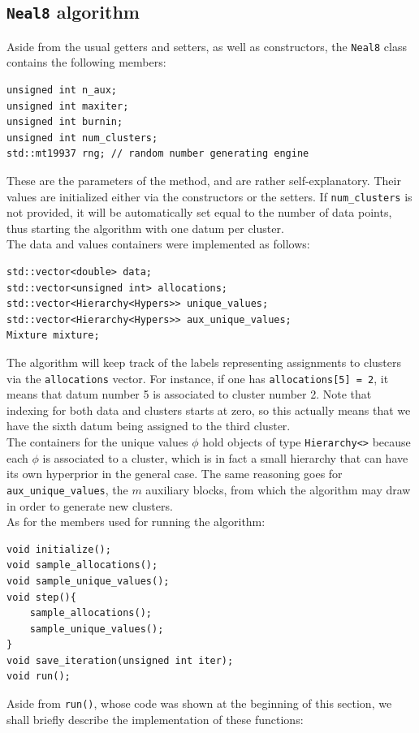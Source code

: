 \subsection{\texttt{Neal8} algorithm}
Aside from the usual getters and setters, as well as constructors, the \verb|Neal8| class contains the following members:
\begin{verbatim}
unsigned int n_aux;
unsigned int maxiter;
unsigned int burnin;
unsigned int num_clusters;
std::mt19937 rng; // random number generating engine
\end{verbatim}
These are the parameters of the method, and are rather self-explanatory.
Their values are initialized either via the constructors or the setters.
If \verb|num_clusters| is not provided, it will be automatically set equal to the number of data points, thus starting the algorithm with one datum per cluster. \\
The data and values containers were implemented as follows:
\begin{verbatim}
std::vector<double> data;
std::vector<unsigned int> allocations;
std::vector<Hierarchy<Hypers>> unique_values;
std::vector<Hierarchy<Hypers>> aux_unique_values;
Mixture mixture;
\end{verbatim}
The algorithm will keep track of the labels representing assignments to clusters via the \verb|allocations| vector.
For instance, if one has \verb|allocations[5] = 2|, it means that datum number 5 is associated to cluster number 2.
Note that indexing for both data and clusters starts at zero, so this actually means that we have the sixth datum being assigned to the third cluster. \\
The containers for the unique values $\phi$ hold objects of type \verb|Hierarchy<>| because each $\phi$ is associated to a cluster, which is in fact a small hierarchy that can have its own hyperprior in the general case.
The same reasoning goes for \verb|aux_unique_values|, the $m$ auxiliary blocks, from which the algorithm may draw in order to generate new clusters. \\
As for the members used for running the algorithm:
\begin{verbatim}
void initialize();
void sample_allocations();
void sample_unique_values();
void step(){
    sample_allocations();
    sample_unique_values();
}
void save_iteration(unsigned int iter);
void run();
\end{verbatim}
Aside from \verb|run()|, whose code was shown at the beginning of this section, we shall briefly describe the implementation of these functions:
